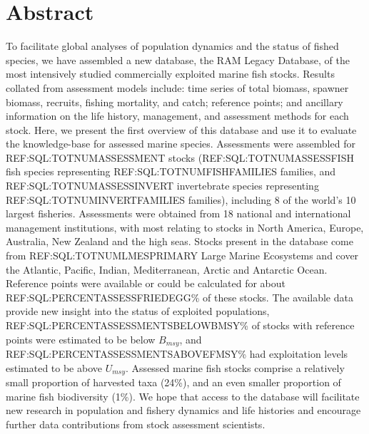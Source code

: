 \section*{Abstract}


To facilitate global analyses of population dynamics and the status of
fished species, we have assembled a new database, the RAM Legacy
Database, of the most intensively studied commercially exploited
marine fish stocks. Results collated from assessment models include:
time series of total biomass, spawner biomass, recruits, fishing
mortality, and catch; reference points; and ancillary information on
the life history, management, and assessment methods for each stock.
Here, we present the first overview of this database and use it to
evaluate the knowledge-base for assessed marine species.  Assessments
were assembled for REF:SQL:TOTNUMASSESSMENT stocks
(REF:SQL:TOTNUMASSESSFISH fish species representing
REF:SQL:TOTNUMFISHFAMILIES families, and REF:SQL:TOTNUMASSESSINVERT
invertebrate species representing REF:SQL:TOTNUMINVERTFAMILIES
families), including 8 of the world's 10 largest fisheries.
Assessments were obtained from 18 national and international
management institutions, with most relating to stocks in North
America, Europe, Australia, New Zealand and the high seas. Stocks
present in the database come from REF:SQL:TOTNUMLMESPRIMARY Large
Marine Ecosystems and cover the Atlantic, Pacific, Indian,
Mediterranean, Arctic and Antarctic Ocean. Reference points were
available or could be calculated for about
REF:SQL:PERCENTASSESSFRIEDEGG\% of these stocks. The available data
provide new insight into the status of exploited populations,
REF:SQL:PERCENTASSESSMENTSBELOWBMSY\% of stocks with reference points
were estimated to be below $B_{msy}$, and
REF:SQL:PERCENTASSESSMENTSABOVEFMSY\% had exploitation levels
estimated to be above $U_{msy}$.  Assessed marine fish stocks comprise
a relatively small proportion of harvested taxa (24\%), and an even
smaller proportion of marine fish biodiversity (1\%). We hope that
access to the database will facilitate new research in population and
fishery dynamics and life histories and encourage further data
contributions from stock assessment scientists.


